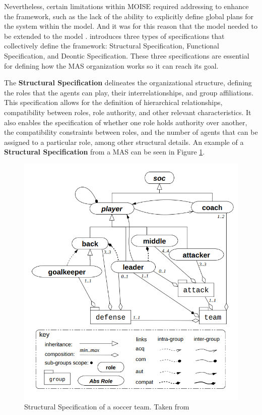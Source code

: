 Nevertheless, certain limitations within MOISE required addressing to enhance the framework, such as the lack of the ability to explicitly define global plans for the system within the model. And it was for this reason that the model needed to be extended to the \MOISEp model \cite{MOISEp}. \MOISEp introduces three types of specifications that collectively define the framework: Structural Specification, Functional Specification, and Deontic Specification. These three specifications are essential for defining how the MAS organization works so it can reach its goal.

The \textbf{Structural Specification} delineates the organizational structure, defining the roles that the agents can play, their interrelationships, and group affiliations. This specification allows for the definition of hierarchical relationships, compatibility between roles, role authority, and other relevant characteristics. It also enables the specification of whether one role holds authority over another, the compatibility constraints between roles, and the number of agents that can be assigned to a particular role, among other structural details. An example of a \textbf{Structural Specification} from a MAS can be seen in Figure \ref{fig:moise_ss}.

\begin{figure}
    \centering
    \includegraphics[width=0.75\linewidth]{images/MOISE - SS.png}
    \caption{Structural Specification of a soccer team. Taken from \cite{MOISEp}}
    \label{fig:moise_ss}
\end{figure}

